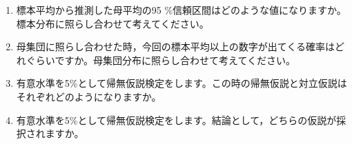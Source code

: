 \begin{enumerate}
	\item 標本平均から推測した母平均の95 \%信頼区間はどのような値になりますか。標本分布に照らし合わせて考えてください。
	\item 母集団に照らし合わせた時，今回の標本平均以上の数字が出てくる確率はどれぐらいですか。母集団分布に照らし合わせて考えてください。
	\item 有意水準を5\%として帰無仮説検定をします。この時の帰無仮説と対立仮説はそれぞれどのようになりますか。
	\item 有意水準を5\%として帰無仮説検定をします。結論として，どちらの仮説が採択されますか。
\end{enumerate}
